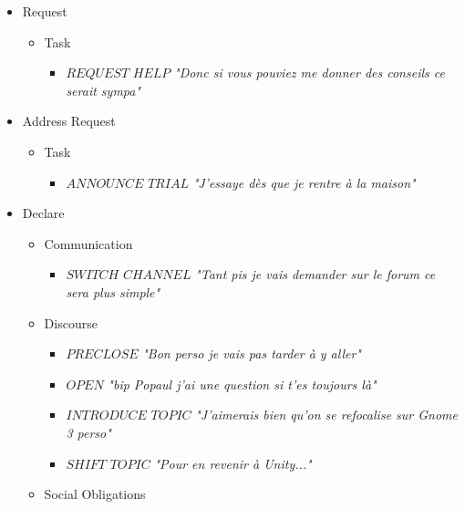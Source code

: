 \begin{itemize}
\begin{itemize}
\begin{itemize}
				\end{itemize}
		\end{itemize}
	\item Request
		\begin{itemize}
			\item Task
				\begin{itemize}
					\item $REQUEST$ $HELP$
						\newline \textit{"Donc si vous pouviez me donner des conseils ce serait sympa"}
				\end{itemize}
		\end{itemize}
	\item Address Request
		\begin{itemize}
			\item Task
				\begin{itemize}
					\item $ANNOUNCE$ $TRIAL$
						\newline \textit{"J'essaye dès que je rentre à la maison"}
				\end{itemize}
		\end{itemize}
	\item Declare
		\begin{itemize}
			\item Communication
				\begin{itemize}
					\item $SWITCH$ $CHANNEL$
						\newline \textit{"Tant pis je vais demander sur le forum ce sera plus simple"}
				\end{itemize}
			\item Discourse
				\begin{itemize}
					\item $PRECLOSE$
						\newline \textit{"Bon perso je vais pas tarder à y aller"}
					\item $OPEN$
						\newline \textit{"bip Popaul j'ai une question si t'es toujours là"}
					\item $INTRODUCE$ $TOPIC$
						\newline \textit{"J'aimerais bien qu'on se refocalise sur Gnome 3 perso"}
					\item $SHIFT$ $TOPIC$
						\newline \textit{"Pour en revenir à Unity..."}
				\end{itemize}
			\item Social Obligations
				\begin{itemize}

\end{itemize}
\end{itemize}
\end{itemize}
